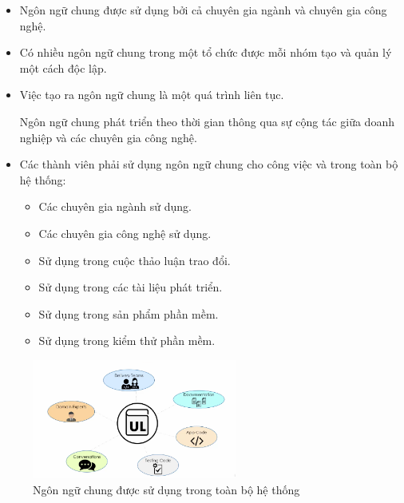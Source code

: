 \begin{itemize}

\item Ngôn ngữ chung được sử dụng bởi cả chuyên gia ngành và chuyên gia công nghệ.

\item Có nhiều ngôn ngữ chung trong một tổ chức được mỗi nhóm tạo và quản lý một cách độc lập.

\item Việc tạo ra ngôn ngữ chung là một quá trình liên tục.

Ngôn ngữ chung phát triển theo thời gian thông qua sự cộng tác giữa doanh nghiệp và các chuyên gia công nghệ.

\item Các thành viên phải sử dụng ngôn ngữ chung cho công việc và trong toàn bộ hệ thống:

\begin{itemize}

\item Các chuyên gia ngành sử dụng.
\item Các chuyên gia công nghệ sử dụng. 
\item Sử dụng trong cuộc thảo luận trao đổi.
\item Sử dụng trong các tài liệu phát triển.
\item Sử dụng trong sản phẩm  phần mềm.
\item Sử dụng trong  kiểm thử phần mềm.

\end{itemize}

\end{itemize}

\begin{figure}[H]

\centering

\includegraphics[width = 0.6\textwidth]{pictures/NgonNguChung/main.png}

\caption{Ngôn ngữ chung được sử dụng  trong toàn bộ hệ thống}

\end{figure}


